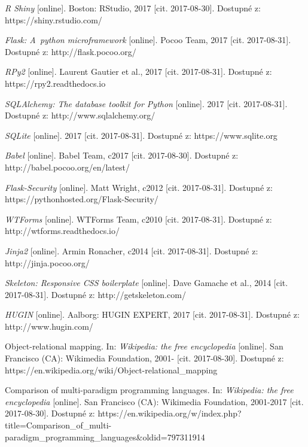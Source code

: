 \documentclass[a4paper,twoside,12pt]{scrbook}
\begin{document}
\begin{thebibliography}{99}
	 \textit{R Shiny} [online]. Boston: RStudio, 2017 [cit. 2017-08-30]. Dostupné z: https://shiny.rstudio.com/

	 \textit{Flask: A~python microframework} [online]. Pocoo Team, 2017 [cit. 2017-08-31]. Dostupné z: http://flask.pocoo.org/

	 \textit{RPy2} [online]. Laurent Gautier et al., 2017 [cit. 2017-08-31]. Dostupné z: https://rpy2.readthedocs.io

	 \textit{SQLAlchemy: The database toolkit for Python} [online]. 2017 [cit. 2017-08-31]. Dostupné z: http://www.sqlalchemy.org/

	 \textit{SQLite} [online]. 2017 [cit. 2017-08-31]. Dostupné z: https://www.sqlite.org

	 \textit{Babel} [online]. Babel Team, c2017 [cit. 2017-08-30]. Dostupné z: http://babel.pocoo.org/en/latest/

	 \textit{Flask-Security} [online]. Matt Wright, c2012 [cit. 2017-08-31]. Dostupné z: https://pythonhosted.org/Flask-Security/

	 \textit{WTForms} [online]. WTForms Team, c2010 [cit. 2017-08-31]. Dostupné z: http://wtforms.readthedocs.io/

	 \textit{Jinja2} [online]. Armin Ronacher, c2014 [cit. 2017-08-31]. Dostupné z: http://jinja.pocoo.org/

	 \textit{Skeleton: Responsive CSS boilerplate} [online]. Dave Gamache et al., 2014 [cit. 2017-08-31]. Dostupné z: http://getskeleton.com/

	 \textit{HUGIN} [online]. Aalborg: HUGIN EXPERT, 2017 [cit. 2017-08-31]. Dostupné z: http://www.hugin.com/


	 Object-relational mapping. In: \textit{Wikipedia: the free encyclopedia} [online]. San Francisco (CA): Wikimedia Foundation, 2001- [cit. 2017-08-30]. Dostupné z: https://en.wikipedia.org/wiki/Object-relational\_mapping

	 Comparison of multi-paradigm programming languages. In: \textit{Wikipedia: the free encyclopedia} [online]. San Francisco (CA): Wikimedia Foundation, 2001-2017 [cit. 2017-08-30]. Dostupné z: https://en.wikipedia.org/w/index.php?title=Comparison\_of\_multi-paradigm\_programming\_languages\&oldid=797311914


\end{thebibliography}
\end{document}
